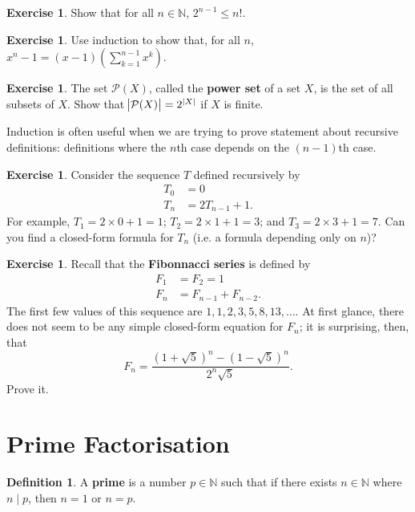 \documentclass[a4paper,leqno]{article}
\numberwithin{equation}{section}
\theoremstyle{definition}
\newtheorem{defn}[equation]{Definition}
\newtheorem{exercise}[equation]{Exercise}
\theoremstyle{remark}
\newcommand{\df}[1]{\textbf{#1}}
\begin{document}
\begin{exercise}
  Show that for all $ n \in \mathbb{N} $, $ 2^{n - 1} \leq n! $.
\end{exercise}

\begin{exercise}
  Use induction to show that, for all $ n $, $ x^n - 1 = (x - 1)\left(\sum_{k = 1}^{n - 1} x^k \right) $.
\end{exercise}

\begin{exercise}
  The set $ \mathcal{P}(X) $, called the \textbf{power set} of a set $ X $, is the set of all subsets of $ X $. Show
  that $ \abs{\mathcal{P}(X)} = 2^{\thinspace\abs{X}} $ if $ X $ is finite.
\end{exercise}

Induction is often useful when we are trying to prove statement about recursive definitions: definitions where
the $n$th case depends on the $ (n - 1)$th case.

\begin{exercise}
  Consider the sequence $ T $ defined recursively by
  \begin{align*}
    T_0 &= 0\\
    T_n &= 2T_{n - 1} + 1.
  \end{align*}
  For example, $ T_1 = 2 \times 0 + 1 = 1 $; $ T_2 = 2 \times 1 + 1 = 3 $; and $ T_3 = 2 \times 3 + 1 = 7 $. Can you find
  a closed-form formula for $ T_n $ (i.e. a formula depending only on $ n $)?
\end{exercise}

\begin{exercise}
  Recall that the \df{Fibonnacci series} is defined by
  \begin{align*}
    F_1 &= F_2 = 1\\
    F_n &= F_{n - 1} + F_{n - 2}.
  \end{align*}
  The first few values of this sequence are $ 1, 1, 2, 3, 5, 8, 13, \dots $. At first glance, there does not seem to be
  any simple closed-form equation for $ F_n $; it is surprising, then, that
  \begin{displaymath}
    F_n = \frac{\left(1 + \sqrt{5}\right)^n - \left(1 - \sqrt{5}\right)^n}{2^n \sqrt{5}}.
  \end{displaymath}
  Prove it.
\end{exercise}


\section{Prime Factorisation}
\begin{defn}
  A \df{prime} is a number $ p \in \mathbb{N} $ such that if there exists $ n \in \mathbb{N} $ where $ n \mid p $, then $ n = 1 $ or $ n = p $.
\end{defn}
\end{document}
